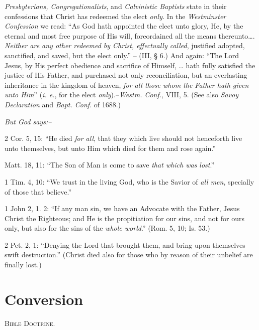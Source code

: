 \documentclass[
]{book}
\begin{document}
\emph{Presbyterians, Congregationalists}, and \emph{Calvinistic Baptists} state in their confessions that Christ has redeemed the elect \emph{only}. In the \emph{Westminster Confession} we read: ``As God hath appointed the elect unto glory, He, by the eternal and most free purpose of His will, foreordained all the means thereunto\ldots. \emph{Neither are any other redeemed by Christ, effectually called}, justified adopted, sanctified, and saved, but the elect only.'' -- (III, § 6.) And again: ``The Lord Jesus, by His perfect obedience and sacrifice of Himself, \ldots{} hath fully satisfied the justice of His Father, and purchased not only reconciliation, but an everlasting inheritance in the kingdom of heaven, \emph{for all those whom the Father hath given unto Him}'' (\emph{i. e.}, for the elect \emph{only}).--\emph{Westm. Conf.}, VIII, 5. (See also \emph{Savoy Declaration} and \emph{Bapt. Conf}. of 1688.)

\begin{center}
\textsl{But God says:--}
\end{center}

2 Cor. 5, 15: ``He died \emph{for all}, that they which live should not henceforth live unto themselves, but unto Him which died for them and rose again.''

Matt. 18, 11: ``The Son of Man is come to save \emph{that which was lost}.''

1 Tim. 4, 10: ``We trust in the living God, who is the Savior of \emph{all men}, specially of those that believe.''

1 John 2, 1. 2: ``If any man sin, we have an Advocate with the Father, Jesus Christ the Righteous; and He is the propitiation for our sins, and not for ours only, but also for the sins of the \emph{whole world}.'' (Rom. 5, 10; Is. 53.)

2 Pet. 2, 1: ``Denying the Lord that brought them, and bring upon themselves swift destruction.'' (Christ died also for those who by reason of their unbelief are finally lost.)

\hypertarget{conversion}{%
\section*{\texorpdfstring{Conversion}{Conversion}}\label{conversion}}

\begin{center}
\textsc{Bible Doctrine.}
\end{center}
\end{document}
